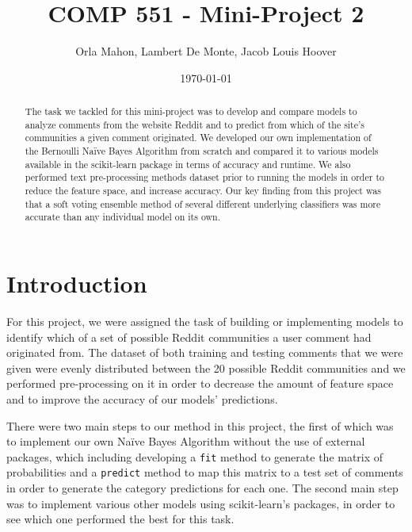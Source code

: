 \documentclass[letterpaper, 11pt]{article}
\begin{document}
\title{
    COMP 551 - Mini-Project 2
}
\author{
    Orla Mahon, Lambert De Monte, Jacob Louis Hoover
}

\date{\today}

\maketitle

\thispagestyle{empty}
\pagestyle{plain}
\begin{abstract}
The task we tackled for this mini-project was to develop and compare models to analyze comments from the website Reddit and to predict from which of the site's communities a given comment originated. We developed our own implementation of the Bernoulli Na\"ive Bayes Algorithm from scratch and compared it to various models available in the scikit-learn package in terms of accuracy and runtime. We also performed text pre-processing methods dataset prior to running the models in order to reduce the feature space, and increase accuracy. Our key finding from this project was that a soft voting ensemble method of several different underlying classifiers was more accurate than any individual model on its own. 

\end{abstract}
\section{Introduction}

For this project, we were assigned the task of building or implementing models to identify which of a set of possible Reddit communities a user comment had originated from. The dataset of both training and testing comments that we were given were evenly distributed between the 20 possible Reddit communities and we performed pre-processing on it in order to decrease the amount of feature space and to improve the accuracy of our models' predictions. 

There were two main steps to our method in this project, the first of which was to implement our own Na\"ive Bayes Algorithm without the use of external packages, which including developing a \texttt{fit} method to generate the matrix of probabilities and a \texttt{predict} method to map this matrix to a test set of comments in order to generate the category predictions for each one. The second main step was to implement various other models using scikit-learn's packages, in order to see which one performed the best for this task. 
\end{document}
